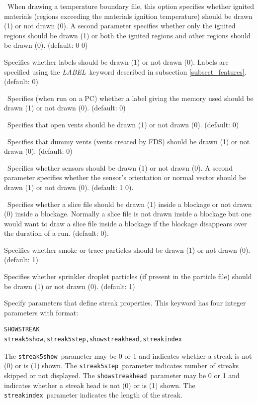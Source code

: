 \documentclass[11pt,twoside]{book}
\begin{document}
\ When drawing a temperature boundary file, this option
specifies whether ignited materials (regions exceeding the materials
ignition temperature) should be drawn (1) or not drawn (0).
A second parameter specifies whether only the ignited regions
should be drawn (1) or both the ignited regions and other regions should be drawn (0).
(default: 0 0)


Specifies whether labels should be drawn (1) or
not drawn (0).  Labels are specified using the {\em LABEL}\
keyword described in subsection \ref{subsect_features}. (default:
0)

\ Specifies (when run on a PC) whether a label
giving the memory used should be drawn (1) or not drawn (0).
(default: 0)

\ Specifies that open vents should be drawn
(1) or not drawn (0).  (default: 0)

\ Specifies that dummy vents (vents created
by FDS) should be drawn (1) or not drawn (0).  (default: 0)

\ Specifies whether sensors should be drawn (1) or not drawn (0).
A second parameter specifies whether the sensor's orientation or normal vector
should be drawn (1) or not drawn (0). (default: 1 0).

\ Specifies whether a slice file should be drawn (1) inside
a blockage or not drawn (0) inside a blockage.  Normally a slice file
is not drawn inside a blockage but one would want to draw a
slice file inside a blockage if the blockage disappears over the
duration of a run.  (default: 0).


Specifies whether smoke or trace particles
should be drawn (1) or not drawn (0). (default: 1)

Specifies whether
sprinkler droplet particles (if present in the particle file)
should be drawn (1) or not drawn (0).
(default: 1)

Specify parameters that define streak properties.  This keyword
has four integer parameters with format:
\begin{lstlisting}
SHOWSTREAK
streak5show,streak5step,showstreakhead,streakindex
\end{lstlisting}
The {\tt streak5show}\ parameter may be 0 or 1 and indicates whether a
streak is not (0) or is (1) shown. The {\tt streak5step}\ parameter
indicates number of streaks skipped or not displayed.
The {\tt showstreakhead}\ parameter may be 0 or 1 and indicates
whether a streak head is not (0) or is (1) shown.
The {\tt streakindex}\ parameter indicates the length of the streak.
\end{document}
